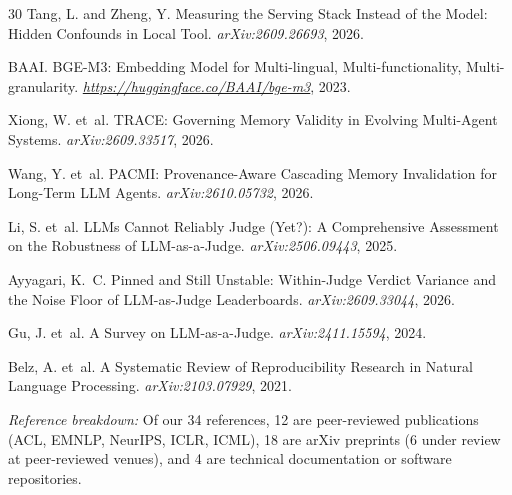 \documentclass[11pt]{article}
\begin{document}
\begin{thebibliography}{30}
Tang, L. and Zheng, Y.
\newblock Measuring the Serving Stack Instead of the Model: Hidden Confounds in Local Tool. \newblock \emph{arXiv:2609.26693}, 2026.


BAAI.
\newblock BGE-M3: Embedding Model for Multi-lingual, Multi-functionality, Multi-granularity.
\newblock \emph{\url{https://huggingface.co/BAAI/bge-m3}}, 2023.


Xiong, W. et~al.
\newblock TRACE: Governing Memory Validity in Evolving Multi-Agent Systems.
\newblock \emph{arXiv:2609.33517}, 2026.

Wang, Y. et~al.
\newblock PACMI: Provenance-Aware Cascading Memory Invalidation for Long-Term LLM Agents.
\newblock \emph{arXiv:2610.05732}, 2026.

Li, S. et~al.
\newblock LLMs Cannot Reliably Judge (Yet?): A Comprehensive Assessment on the Robustness of LLM-as-a-Judge.
\newblock \emph{arXiv:2506.09443}, 2025.



Ayyagari, K.~C.
\newblock Pinned and Still Unstable: Within-Judge Verdict Variance and the Noise Floor of LLM-as-Judge Leaderboards.
\newblock \emph{arXiv:2609.33044}, 2026.

Gu, J. et~al.
\newblock A Survey on LLM-as-a-Judge.
\newblock \emph{arXiv:2411.15594}, 2024.

Belz, A. et~al.
\newblock A Systematic Review of Reproducibility Research in Natural Language Processing.
\newblock \emph{arXiv:2103.07929}, 2021.
\end{thebibliography}

\vspace{0.5em}
\noindent\textit{Reference breakdown:} Of our 34 references, 12 are peer-reviewed publications (ACL, EMNLP, NeurIPS, ICLR, ICML), 18 are arXiv preprints (6 under review at peer-reviewed venues), and 4 are technical documentation or software repositories.
\end{document}

